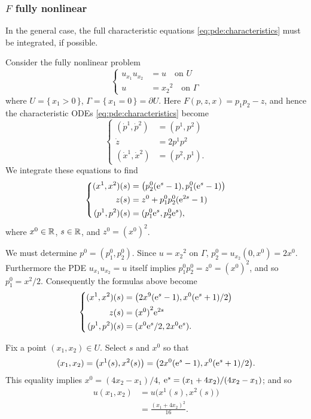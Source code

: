 \subsubsection[\(F\) fully nonlinear]{\(F\) fully nonlinear}
In the general case, the full characteristic equations
\eqref{eq:pde:characteristics} must be integrated, if possible.
\begin{example}
  Consider the fully nonlinear problem
  \begin{equation}
    \label{eq:pde:nonlinear-ex-3}
    \left\{
    \begin{aligned}
      u_{x_1}u_{x_2}&=u\quad\text{on \(U\)}\\
      u&={x_2}^2\quad\text{on \(\Gamma\)}
    \end{aligned}
    \right.
  \end{equation}
  where \(U=\{\,x_1>0\,\}\), \(\Gamma=\{\,x_1=0\,\}=\partial U\). Here
  \(F(p,z,x)=p_1p_2-z\), and hence the characteristic ODEs
  \eqref{eq:pde:characteristics} become
  \[
    \left\{
    \begin{aligned}
      (\dot p^1,\dot p^2)&=(p^1,p^2)\\
      \dot z&=2p^1p^2\\
      (\dot x^1,\dot x^2)&=(p^2,p^1).
    \end{aligned}
    \right.
  \]
  We integrate these equations to find
  \[
    \left\{
    \begin{aligned}
      (x^1,x^2)(s)&=\bigl(p_2^0(\mathrm{e}^s-1),p_1^0(\mathrm{e}^s-1)\bigr)\\
      z(s)&=z^0+p_1^0p_2^0(\mathrm{e}^{2s}-1)\\
      (p^1,p^2)(s)&=(p_1^0\mathrm{e}^s,p_2^0\mathrm{e}^s),
    \end{aligned}
    \right.
  \]
  where \(x^0\in\mathbb{R}\), \(s\in\mathbb{R}\), and \(z^0={(x^0)}^2\).

  We must determine \(p^0=(p_1^0,p_2^0)\). Since \(u={x_2}^2\) on
  \(\Gamma\), \(p_2^0=u_{x_2}(0,x^0)=2x^0\). Furthermore the PDE
  \(u_{x_1}u_{x_2}=u\) itself implies \(p_1^0p_2^0=z^0={(x^0)}^2\), and so
  \(p_1^0=x^2/2\). Consequently the formulas above become
  \[
    \left\{
      \begin{aligned}
        (x^1,x^2)(s)&=\bigl(2x^9(\mathrm{e}^s-1),x^0(\mathrm{e}^s+1)/2\bigr)\\
        z(s)&={(x^0)}^2\mathrm{e}^{2s}\\
        (p^1,p^2)(s)&=(x^0\mathrm{e}^s/2,2x^0\mathrm{e}^s).
      \end{aligned}
    \right.
  \]

  Fix a point \((x_1,x_2)\in U\). Select \(s\) and \(x^0\) so that
  \[
    (x_1,x_2)=\bigl( x^1(s),x^2(s) \bigr)=\bigl(
    2x^0(\mathrm{e}^s-1),x^0(\mathrm{e}^s+1)/2 \bigr).
  \]
  This equality implies \(x^0=(4x_2-x_1)/4\),
  \(\mathrm{e}^s=(x_1+4x_2)/(4x_2-x_1)\); and so
  \begin{align*}
    u(x_1,x_2)&=u\bigl( x^1(s),x^2(s) \bigr)\\
              &=\frac{(x_1+4x_2)^2}{16}.
  \end{align*}
\end{example}

